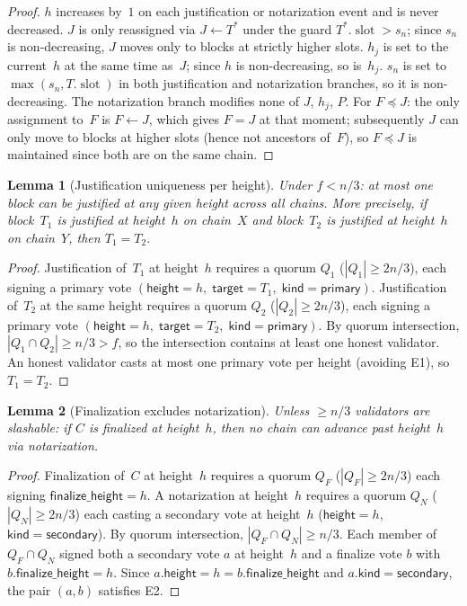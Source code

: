 \ifx\litemode\undefined\documentclass{article}\fi
\newcommand{\slot}[0]{\ensuremath{\operatorname{\mathrm{slot}}}}
\theoremstyle{plain}
\newtheorem{lemma}{Lemma}
\theoremstyle{definition}
\theoremstyle{remark}
\begin{document}
\begin{proof}
$h$ increases by~$1$ on each justification or notarization event and is never decreased.
$J$ is only reassigned via $J \gets T^*$ under the guard $T^*.\slot > s_n$; since $s_n$ is non-decreasing, $J$ moves only to blocks at strictly higher slots.
$h_j$ is set to the current~$h$ at the same time as~$J$; since $h$ is non-decreasing, so is~$h_j$.
$s_n$ is set to $\max(s_n, T.\slot)$ in both justification and notarization branches, so it is non-decreasing.
The notarization branch modifies none of $J$, $h_j$, $P$.
For $F \preceq J$: the only assignment to~$F$ is $F \gets J$, which gives $F = J$ at that moment; subsequently $J$ can only move to blocks at higher slots (hence not ancestors of~$F$), so $F \preceq J$ is maintained since both are on the same chain.
\end{proof}

\begin{lemma}[Justification uniqueness per height]\label{lem:uniqueness}
Under $f < n/3$: at most one block can be justified at any given height across all chains.
More precisely, if block~$T_1$ is justified at height~$h$ on chain~$X$ and block~$T_2$ is justified at height~$h$ on chain~$Y$, then $T_1 = T_2$.
\end{lemma}

\begin{proof}
Justification of~$T_1$ at height~$h$ requires a quorum $Q_1$ ($|Q_1| \geq 2n/3$), each signing a primary vote $(\mathsf{height} = h,\; \mathsf{target} = T_1,\; \mathsf{kind} = \mathsf{primary})$.
Justification of~$T_2$ at the same height requires a quorum $Q_2$ ($|Q_2| \geq 2n/3$), each signing a primary vote $(\mathsf{height} = h,\; \mathsf{target} = T_2,\; \mathsf{kind} = \mathsf{primary})$.
By quorum intersection, $|Q_1 \cap Q_2| \geq n/3 > f$, so the intersection contains at least one honest validator.
An honest validator casts at most one primary vote per height (avoiding E1), so $T_1 = T_2$.
\end{proof}

\begin{lemma}[Finalization excludes notarization]\label{lem:finexclude}
Unless $\geq n/3$ validators are slashable: if $C$ is finalized at height~$h$, then no chain can advance past height~$h$ via notarization.
\end{lemma}

\begin{proof}
Finalization of~$C$ at height~$h$ requires a quorum $Q_F$ ($|Q_F| \geq 2n/3$) each signing $\mathsf{finalize\_height} = h$.
A notarization at height~$h$ requires a quorum $Q_N$ ($|Q_N| \geq 2n/3$) each casting a secondary vote at height~$h$ ($\mathsf{height} = h$, $\mathsf{kind} = \mathsf{secondary}$).
By quorum intersection, $|Q_F \cap Q_N| \geq n/3$.
Each member of $Q_F \cap Q_N$ signed both a secondary vote $a$ at height~$h$ and a finalize vote $b$ with $b.\mathsf{finalize\_height} = h$.
Since $a.\mathsf{height} = h = b.\mathsf{finalize\_height}$ and $a.\mathsf{kind} = \mathsf{secondary}$, the pair $(a,b)$ satisfies E2.
\end{proof}
\end{document}
